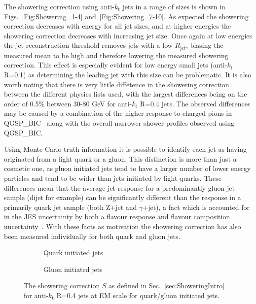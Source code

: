The showering correction using anti-$k_\mathrm{t}$ jets in a range of sizes is shown in Figs.~\ref{Fig:Showering_1-4} and~\ref{Fig:Showering_7-10}.  
As expected the showering correction decreases with energy for all jet sizes, and at higher energies the showering correction decreases with increasing jet size.  
Once again at low energies the jet reconstruction threshold removes jets with a low $R_{\mathrm jet}$, biasing the measured mean to be high and therefore lowering the measured showering correction.  
This effect is especially evident for low energy small jets (anti-$k_\mathrm{t}$ R=0.1) as determining the leading jet with this size can be problematic.  
It is also worth noting that there is very little diffetence in the showering correction between the different physics lists used, with the largest differences being on the order of 0.5\% between 30-80 GeV for anti-$k_\mathrm{t}$ R=0.4 jets.  
The observed differences may be caused by a combination of the higher response to charged pions in QGSP\_BIC~\cite{Zhang:2253040} along with the overall narrower shower profiles observed using QGSP\_BIC\cite{Adloff:2013jqa}.  

Using Monte Carlo truth information it is possible to identify each jet as having originated from a light quark or a gluon.  
This distinction is more than just a cosmetic one, as gluon initiated jets tend to have a larger number of lower energy particles and tend to be wider than jets initiated by light quarks.  
These differences mean that the average jet response for a predominantly gluon jet sample (dijet for example) can be significantly different than the response in a primarily quark jet sample (both Z+jet and $\gamma$+jet), a fact which is accounted for in the JES uncertainty by both a flavour response and flavour composition uncertainty~\cite{Aaboud:2017jcu}.  
With these facts as motivation the showering correction has also been measured individually for both quark and gluon jets.  

\begin{figure}[!ht]
  \centering
  \begin{subfigure}{.5\textwidth}
    \centering
    \caption{Quark initiated jets}
  \end{subfigure}%
  \begin{subfigure}{.5\textwidth}  \centering
    \caption{Gluon initiated jets}
  \end{subfigure}
  \caption[Showering correction for quark/gluon initiated jets.]
{\small The showering correction $S$ as defined in Sec.~\ref{sec:ShoweringIntro} for anti-$k_\mathrm{t}$ R=0.4 jets at EM scale for quark/gluon initiated jets.  }
  \label{Fig:Showering_QG4}
\end{figure} 

